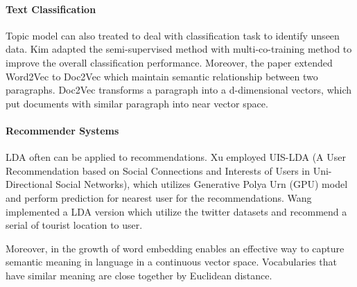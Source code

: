 \paragraph{Text Classification}Topic model can also treated to deal with classification task to identify unseen data. Kim \cite{kim_multi-co-training_2019} adapted the semi-supervised method with multi-co-training method to improve the overall classification performance. Moreover, the paper extended Word2Vec to Doc2Vec which maintain semantic relationship between two paragraphs. Doc2Vec transforms a paragraph into a d-dimensional vectors, which put documents with similar paragraph into near vector space.
\paragraph{Recommender Systems} LDA often can be applied to recommendations. Xu\cite{xu_uis-lda_2017} employed UIS-LDA (A User Recommendation based on Social Connections and Interests of Users in Uni-Directional Social Networks), which utilizes Generative Polya Urn (GPU) model and perform prediction for nearest user for the recommendations. Wang \cite{wang_st-sage_2017} implemented a LDA version which utilize the twitter datasets and recommend a serial of tourist location to user.

Moreover, in the growth of word embedding \cite{mikolov_distributed_nodate} enables an effective way to capture semantic meaning in language in a continuous vector space. Vocabularies that have similar meaning are close together by Euclidean distance. 
